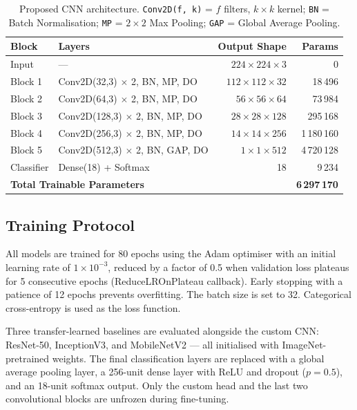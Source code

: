 \begin{table}[H]
  \centering
  \caption{Proposed CNN architecture. \texttt{Conv2D(f, k)} = $f$ filters,
           $k \times k$ kernel; \texttt{BN} = Batch Normalisation;
           \texttt{MP} = $2 \times 2$ Max Pooling; \texttt{GAP} = Global
           Average Pooling.}
  \label{tab:architecture}
  \begin{tabular}{@{}llrr@{}}
    \toprule
    \textbf{Block} & \textbf{Layers} & \textbf{Output Shape} & \textbf{Params} \\
    \midrule
    Input      & ---                                    & $224 \times 224 \times 3$  & 0 \\
    Block 1    & Conv2D(32,3) $\times$ 2, BN, MP, DO   & $112 \times 112 \times 32$ & 18\,496 \\
    Block 2    & Conv2D(64,3) $\times$ 2, BN, MP, DO   & $56 \times 56 \times 64$   & 73\,984 \\
    Block 3    & Conv2D(128,3) $\times$ 2, BN, MP, DO  & $28 \times 28 \times 128$  & 295\,168 \\
    Block 4    & Conv2D(256,3) $\times$ 2, BN, MP, DO  & $14 \times 14 \times 256$  & 1\,180\,160 \\
    Block 5    & Conv2D(512,3) $\times$ 2, BN, GAP, DO & $1 \times 1 \times 512$     & 4\,720\,128 \\
    Classifier & Dense(18) + Softmax                   & 18                        & 9\,234 \\
    \midrule
    \multicolumn{3}{l}{\textbf{Total Trainable Parameters}} & \textbf{6\,297\,170} \\
    \bottomrule
  \end{tabular}
\end{table}

\subsection{Training Protocol}

All models are trained for 80 epochs using the Adam optimiser with an initial
learning rate of $1 \times 10^{-3}$, reduced by a factor of 0.5 when
validation loss plateaus for 5 consecutive epochs (ReduceLROnPlateau
callback). Early stopping with a patience of 12 epochs prevents overfitting.
The batch size is set to 32. Categorical cross-entropy is used as the loss
function.

\parsp
Three transfer-learned baselines are evaluated alongside the custom CNN:
ResNet-50, InceptionV3, and MobileNetV2 — all initialised with
ImageNet-pretrained weights. The final classification layers are replaced with
a global average pooling layer, a 256-unit dense layer with ReLU and
dropout ($p = 0.5$), and an 18-unit softmax output. Only the custom head and
the last two convolutional blocks are unfrozen during fine-tuning.

